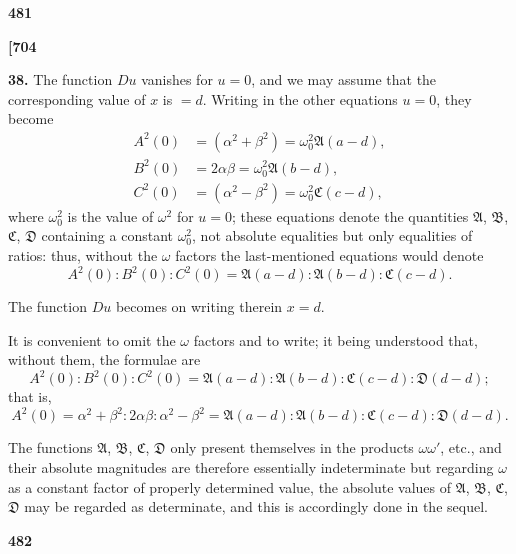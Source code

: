 \documentclass[11pt,a4paper]{book}
\begin{document}
\begin{center}
\textbf{481}
\end{center}

\vspace{0.5em}

\noindent\textbf{[704}

\vspace{0.5em}

\noindent\textbf{38.}\quad
The function $Du$ vanishes for $u = 0$, and we may assume that the corresponding value of $x$ is $= d$. Writing in the other equations $u = 0$, they become
\begin{align*}
A^2(0) &= (\alpha^2 + \beta^2) = \omega_0^2 \mathfrak{A}(a - d), \\
B^2(0) &= 2\alpha\beta = \omega_0^2 \mathfrak{A}(b - d), \\
C^2(0) &= (\alpha^2 - \beta^2) = \omega_0^2 \mathfrak{C}(c - d),
\end{align*}
where $\omega_0^2$ is the value of $\omega^2$ for $u = 0$; these equations denote the quantities $\mathfrak{A}$, $\mathfrak{B}$, $\mathfrak{C}$, $\mathfrak{D}$ containing a constant $\omega_0^2$, not absolute equalities but only equalities of ratios: thus, without the $\omega$ factors the last-mentioned equations would denote
\[
A^2(0) : B^2(0) : C^2(0) = \mathfrak{A}(a - d) : \mathfrak{A}(b - d) : \mathfrak{C}(c - d).
\]

The function $Du$ becomes on writing therein $x = d$.

It is convenient to omit the $\omega$ factors and to write; it being understood that, without them, the formulae are
\[
A^2(0) : B^2(0) : C^2(0) = \mathfrak{A}(a - d) : \mathfrak{A}(b - d) : \mathfrak{C}(c - d) : \mathfrak{D}(d - d);
\]
that is,
\[
A^2(0) = \alpha^2 + \beta^2 : 2\alpha\beta : \alpha^2 - \beta^2 = \mathfrak{A}(a - d) : \mathfrak{A}(b - d) : \mathfrak{C}(c - d) : \mathfrak{D}(d - d).
\]

The functions $\mathfrak{A}$, $\mathfrak{B}$, $\mathfrak{C}$, $\mathfrak{D}$ only present themselves in the products $\omega \omega'$, etc., and their absolute magnitudes are therefore essentially indeterminate but regarding $\omega$ as a constant factor of properly determined value, the absolute values of $\mathfrak{A}$, $\mathfrak{B}$, $\mathfrak{C}$, $\mathfrak{D}$ may be regarded as determinate, and this is accordingly done in the sequel.

\vspace{1em}

\begin{center}
\textbf{482}
\end{center}
\end{document}
